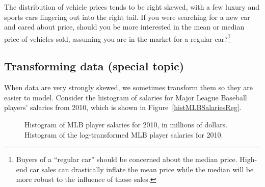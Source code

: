\begin{exercise}
The distribution of vehicle prices tends to be right skewed, with a few luxury and sports cars lingering out into the right tail. If you were searching for a new car and cared about price, should you be more interested in the mean or median price of vehicles sold, assuming you are in the market for a regular car?\footnote{Buyers of a ``regular car'' should be concerned about the median price. High-end car sales can drastically inflate the mean price while the median will be more robust to the influence of those sales.}
\end{exercise}

\subsection{Transforming data (special topic)}
\label{transformingDataSubsection}

When data are very strongly skewed, we sometimes transform them so they are easier to model. Consider the histogram of salaries for Major League Baseball players' salaries from 2010, which is shown in Figure~\ref{histMLBSalariesReg}.

\begin{figure}[ht]
\centering
{}
\caption{ Histogram of MLB player salaries for 2010, in millions of dollars.  Histogram of the log-transformed MLB player salaries for 2010.}
\label{histMLBSalaries}
\end{figure}

